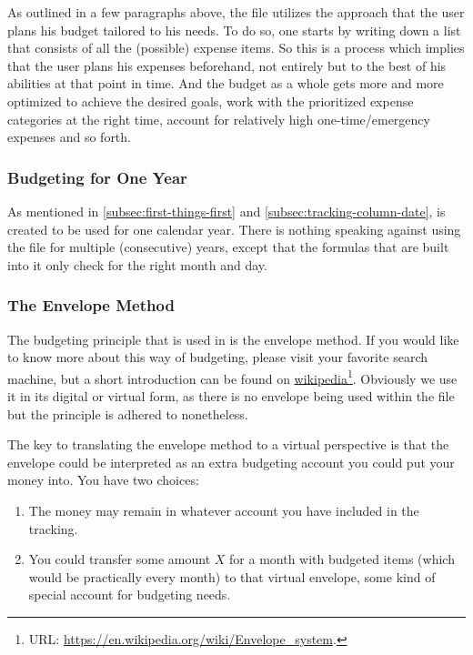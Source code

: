 As outlined in a few paragraphs above, the file utilizes the approach that the user plans his budget tailored to his needs.
To do so, one starts by writing down a list that consists of all the (possible) expense items.
So this is a process which implies that the user plans his expenses beforehand, not entirely but to the best of his abilities at that point in time.
And the budget as a whole gets more and more optimized to achieve the desired goals, work with the prioritized expense categories at the right time, account for relatively high one-time/emergency expenses and so forth.

\subsubsection{Budgeting for One Year}
\label{subsubsec:budgeting-for-one-year}

As mentioned in \autoref{subsec:first-things-first} and \autoref{subsec:tracking-column-date}, \tfn is created to be used for one calendar year.
There is nothing speaking against using the file for multiple (consecutive) years, except that the formulas that are built into it only check for the right month and day.

\subsubsection{The Envelope Method}
\label{subsubsec:budgeting-the-envelope-method}

The budgeting principle that is used in \tfn is the envelope method.
If you would like to know more about this way of budgeting, please visit your favorite search machine, but a short introduction can be found on \href{https://en.wikipedia.org/wiki/Envelope_system}{wikipedia}\footnote{URL: \href{https://en.wikipedia.org/wiki/Envelope_system}{https://en.wikipedia.org/wiki/Envelope{\_}system}.}.
Obviously we use it in its digital or virtual form, as there is no envelope being used within the file but the principle is adhered to nonetheless.

The key to translating the envelope method to a virtual perspective is that the envelope could be interpreted as an extra budgeting account you could put your money into.
You have two choices:
\begin{enumerate}
	\item The money may remain in whatever account you have included in the tracking.
	\item You could transfer some amount \( X \) for a month with budgeted items (which would be practically every month) to that virtual envelope, \ie some kind of special account for budgeting needs.
\end{enumerate}

